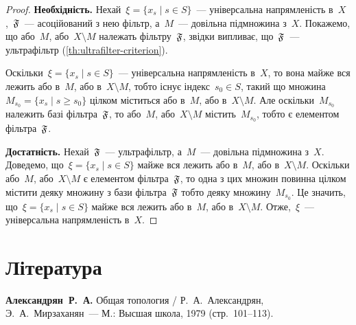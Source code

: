 \begin{proof}
    \textbf{Необхідність.} Нехай~$\xi = \{x_s \mid s \in S\}$~--- універсальна напрямленість в~$X$,~$\frak F$~--- асоційований з нею фільтр, а~$M$~--- довільна підмножина з~$X$. Покажемо, що або~$M$, або~$X \setminus M$ належать фільтру~$\frak F$, звідки випливає, що~$\frak F$~--- ультрафільтр (\cref{th:ultrafilter-criterion}). 
    
    Оскільки~$\xi = \{x_s \mid s \in S\}$~--- універсальна напрямленість в~$X$, то вона майже вся лежить або в~$M$, або в~$X \setminus M$, тобто існує індекс~$s_0 \in S$, такий що множина~$M_{s_0} = \{x_s \mid s \ge s_0\}$ цілком міститься або в~$M$, або в~$X \setminus M$. Але оскільки~$M_{s_0}$ належить базі фільтра~$\frak F$, то або~$M$, або~$X \setminus M$ містить~$M_{s_0}$, тобто є елементом фільтра~$\frak F$. 
    
    \textbf{Достатність.} Нехай~$\frak F$~--- ультрафільтр, а~$M$~--- довільна підмножина з~$X$. Доведемо, що~$\xi = \{x_s \mid s \in S\}$ майже вся лежить або в~$M$, або в~$X \setminus M$. Оскільки або~$M$, або~$X \setminus M$ є елементом фільтра~$\frak F$, то одна з цих множин повинна цілком містити деяку множину з бази фільтра~$\frak F$ тобто деяку множину~$M_{s_0}$. Це значить, що~$\xi = \{x_s \mid s \in S\}$ майже вся лежить або в~$M$, або в~$X \setminus M$. Отже,~$\xi$~--- універсальна напрямленість в~$X$.
\end{proof}

\section{Література}

\begin{enumerate}[label={[\arabic*]}]
\item \textbf{Александрян~Р.~А.}
Общая топология /
Р.~А.~Александрян, Э.~А.~Мирзаханян~---
М.: Высшая школа, 1979 (стр.~101--113).
\end{enumerate}
